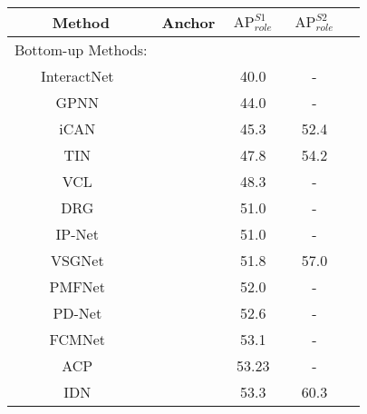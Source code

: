 \documentclass[10pt,twocolumn,letterpaper]{article}
\newcommand{\xmark}{\ding{55}}\newcommand{\cmark}{\ding{51}}
\begin{document}
\begin{table}[t]
\small
  \begin{center}
  \begin{tabular}{ccccc}
  \hline
  Method        &Anchor  & $\operatorname{AP}^{S1}_{role}$ & $\operatorname{AP}^{S2}_{role}$ \\
  \hline\hline
  Bottom-up Methods:                  &                       & \\
  InteractNet~\cite{gkioxari2018detecting}		&\xmark				    &40.0  &-\\
  GPNN~\cite{qi2018learning}    &\xmark				    &44.0  &-\\
  iCAN~\cite{gao2018ican}	      		&\xmark				    &45.3  &52.4\\
  TIN~\cite{li2018transferable}      		&\xmark				    &47.8  &54.2\\
  VCL~\cite{hou2020visual}      		&\xmark				    &48.3  &-\\
  DRG~\cite{Gao-ECCV-DRG}				&\xmark		        &51.0  &-\\
  IP-Net~\cite{wang2020learning}		&\xmark				    &51.0  &-\\
  VSGNet~\cite{Ulutan_2020_CVPR}			&\xmark				    &51.8  &57.0\\ 
  PMFNet~\cite{Wan_2019_ICCV}		&\xmark               &52.0  &-\\ 
  PD-Net~\cite{zhong2020polysemy}			&\xmark               &52.6  &-\\
  FCMNet~\cite{Liu20a}				&\xmark		            &53.1  &-\\
  ACP~\cite{kim2020detecting}		&\xmark	&53.23  &-\\
  IDN~\cite{li2020hoi}			&\xmark		            &53.3  &60.3\\
  

\end{tabular}
\end{center}
\end{table}
\end{document}

